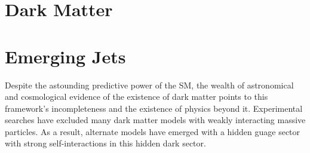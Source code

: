 



\section{Dark Matter}


\section{Emerging Jets}

Despite the astounding predictive power of the SM, the wealth of astronomical and cosmological evidence of the existence of dark matter points to this framework's incompleteness and the existence of physics beyond it. Experimental searches have excluded many dark matter models with weakly interacting massive particles. As a result, alternate models have emerged with a hidden guage sector with strong self-interactions in this hidden dark sector.

